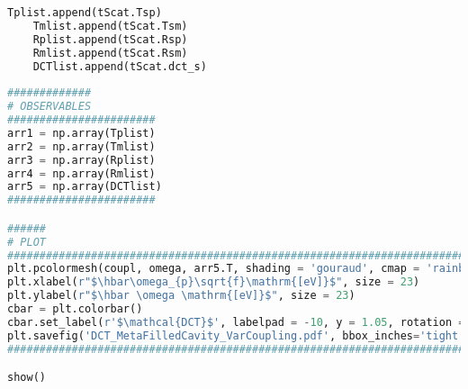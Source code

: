 \documentclass[showpacs,aps,prl,onecolumn,superscriptaddress]{revtex4-1}
\begin{document}
\begin{lstlisting}[language=Python, caption=Script for Figure 15]
    Tplist.append(tScat.Tsp)
    Tmlist.append(tScat.Tsm)
    Rplist.append(tScat.Rsp)
    Rmlist.append(tScat.Rsm)
    DCTlist.append(tScat.dct_s)
    
#############
# OBSERVABLES
#######################    
arr1 = np.array(Tplist)
arr2 = np.array(Tmlist)
arr3 = np.array(Rplist)
arr4 = np.array(Rmlist)
arr5 = np.array(DCTlist)
#######################

######
# PLOT
#####################################################################################
plt.pcolormesh(coupl, omega, arr5.T, shading = 'gouraud', cmap = 'rainbow') 
plt.xlabel(r"$\hbar\omega_{p}\sqrt{f}\mathrm{[eV]}$", size = 23)
plt.ylabel(r"$\hbar \omega \mathrm{[eV]}$", size = 23)
cbar = plt.colorbar()
cbar.set_label(r'$\mathcal{DCT}$', labelpad = -10, y = 1.05, rotation = 0, size = 14)
plt.savefig('DCT_MetaFilledCavity_VarCoupling.pdf', bbox_inches='tight')
#####################################################################################

show()
\end{lstlisting}
\newpage
\end{document}
